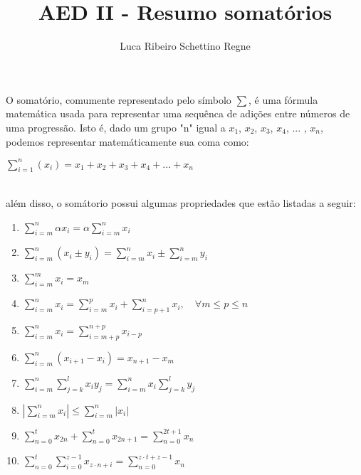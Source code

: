 \documentclass[12pt]{article}
\title{AED II - Resumo somatórios}
\author{Luca Ribeiro Schettino Regne}
\begin{document}
 

\maketitle

O somatório, comumente representado pelo símbolo $\sum$, é uma fórmula matemática 
usada para representar uma sequênca de adições entre números de uma progressão. Isto é,
dado um grupo "n" igual a $x_{1}$, $x_{2}$, $x_{3}$, $x_{4}$, ... , $x_{n}$, podemos
representar matemáticamente sua coma como:\\
\begin{center}
    $\sum^{n}_{i = 1}(x_i) = x_{1} + x_{2} + x_{3} + x_{4} + ... + x_{n} $
\end{center}\\
além disso, o somátorio possui algumas propriedades que estão listadas a seguir:
\begin{enumerate}
    \item ${\displaystyle \sum _{i=m}^{n}\alpha x_{i}=\alpha \sum _{i=m}^{n}x_{i}}$
    \item ${\displaystyle \sum _{i=m}^{n}(x_{i}\pm y_{i})=\sum _{i=m}^{n}x_{i}\pm \sum _{i=m}^{n}y_{i}}$
    \item ${\displaystyle \sum _{i=m}^{m}x_{i}=x_{m}}$
    \item ${\displaystyle \sum _{i=m}^{n}x_{i}=\sum _{i=m}^{p}x_{i}+\sum _{i=p+1}^{n}x_{i},\quad \forall m\leq p\leq n} $
    \item ${\displaystyle \sum _{i=m}^{n}x_{i}=\sum _{i=m+p}^{n+p}x_{i-p}}$
    \item ${\displaystyle \sum _{i=m}^{n}(x_{i+1}-x_{i})=x_{n+1}-x_{m}}$
    \item ${\displaystyle \sum _{i=m}^{n}\sum _{j=k}^{l}x_{i}y_{j}=\sum _{i=m}^{n}x_{i}\sum _{j=k}^{l}y_{j}} $
    \item ${\displaystyle \left|\sum _{i=m}^{n}x_{i}\right|\leq \sum _{i=m}^{n}|x_{i}|}$
    \item ${\displaystyle \sum _{n=0}^{t}x_{2n}+\sum _{n=0}^{t}x_{2n+1}=\sum _{n=0}^{2t+1}x_{n}}$
    \item ${\displaystyle \sum _{n=0}^{t}\sum _{i=0}^{z-1}x_{z\cdot n+i}=\sum _{n=0}^{z\cdot t+z-1}x_{n}}$
\end{enumerate}



\end{document}
